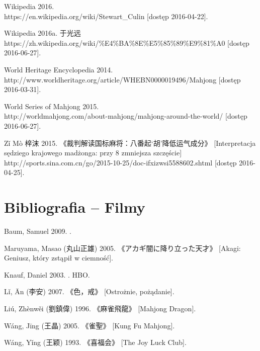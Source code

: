 Wikipedia 2016. 
\\https://en.wikipedia.org/wiki/Stewart\_Culin [dostęp 2016-04-22].

Wikipedia 2016a.  于光远
\\https://zh.wikipedia.org/wiki/\%E4\%BA\%8E\%E5\%85\%89\%E9\%81\%A0 [dostęp
2016-06-27].


World Heritage Encyclopedia 2014. 
\\http://www.worldheritage.org/article/WHEBN0000019496/Mahjong [dostęp
2016-03-31].

World Series of Mahjong 2015. 
\\http://worldmahjong.com/about-mahjong/mahjong-around-the-world/ [dostęp
2016-06-27].

Zǐ Mò 梓沫 2015. 《裁判解读国标麻将：八番起‘胡’降低运气成分》
[Interpretacja sędziego krajowego madżonga:
 przy 8  zmniejsza szczęście] %
\\http://sports.sina.com.cn/go/2015-10-25/doc-ifxizwsi5588602.shtml [dostęp 2016-04-25].

\chapter*{Bibliografia -- Filmy}
Baum, Samuel 2009. .

Maruyama, Masao (丸山正雄) 2005.   
  《アカギ闇に降り立った天才》 [Akagi: Geniusz, który zstąpił w
ciemność].

Knauf, Daniel 2003. . HBO.

Lǐ, Ān (李安) 2007. \tytul 《色，戒》 [Ostrożnie, pożądanie].

Liú, Zhènwěi (劉鎮偉) 1996.  《麻雀飛龍》 [Mahjong Dragon].

Wáng, Jīng (王晶) 2005.  《雀聖》 [Kung Fu Mahjong].

Wáng, Yǐng (王颖) 1993.  《喜福会》 [The Joy Luck Club]. 





